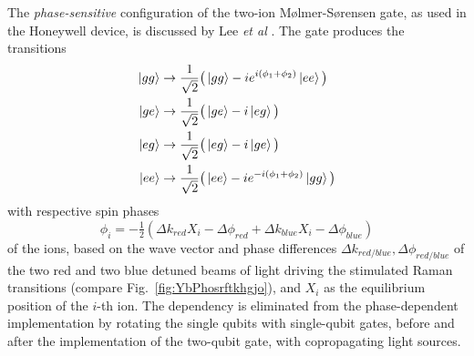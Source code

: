\documentclass[12pt,a4paper]{amsart}
\numberwithin{equation}{section}
\theoremstyle{plain}
\theoremstyle{definition}
\begin{document}
The \emph{phase-sensitive} configuration of the two-ion M\o lmer-S\o rensen gate, as used in the Honeywell device, is discussed by Lee \textit{et al} \cite{ioniPhasCont}. The gate produces the transitions
\begin{equation}\begin{aligned}
\ket{gg}&\rightarrow \frac{1}{\sqrt{2}}\big(\ket{gg}-ie^{i(\phi_1 + \phi_2)}\ket{ee}\big)\\
\ket{ge}&\rightarrow \frac{1}{\sqrt{2}}\big(\ket{ge}-i\ket{eg}\big)\\
\ket{eg}&\rightarrow \frac{1}{\sqrt{2}}\big(\ket{eg}-i\ket{ge}\big)\\
\ket{ee}&\rightarrow \frac{1}{\sqrt{2}}\big(\ket{ee}-ie^{-i(\phi_1 + \phi_2)}\ket{gg}\big)
\end{aligned}\end{equation}
with respective spin phases
$$
\phi_i
= -\tfrac12(\Delta k_{red} X_{i}-\Delta \phi_{red} + \Delta k_{blue} X_{i} - \Delta \phi_{blue})
$$
of the ions, based on the wave vector and phase differences $\Delta k_{red/blue}, \Delta \phi_{red/blue}$ of the two red and two blue detuned beams of light driving the stimulated Raman transitions (compare Fig.~\ref{fig:YbPhosrftkhgjo}), and $X_i$ as the equilibrium position of the $i$-th ion. The dependency is eliminated from the phase-dependent implementation by rotating the single qubits with single-qubit gates, before and after the implementation of the two-qubit gate, with copropagating light sources.




\end{document}
